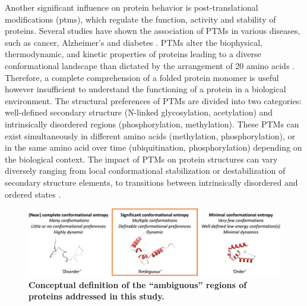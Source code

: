 Another significant influence on protein behavior is post-translational modifications (\gls{ptms}), which regulate the function, activity and stability of proteins. Several studies have shown the association of PTMs in various diseases, such as cancer, Alzheimer’s and diabetes \cite{mclaughlin_where_2016, song_post-translational_2019, bai_proteomic_2021}. PTMs alter the biophysical, thermodynamic, and kinetic properties of proteins leading to a diverse conformational landscape than dictated by the arrangement of 20 amino acids \cite{shental-bechor_effect_2008}. Therefore, a complete comprehension of a folded protein monomer is useful however insufficient to understand the functioning of a protein in a biological environment. The structural preferences of PTMs are divided into two categories: well-defined secondary structure (N-linked glycosylation, acetylation) and intrinsically disordered regions (phosphorylation, methylation). These PTMs can exist simultaneously in different amino acids (methylation, phosphorylation), or in the same amino acid over time (ubiquitination, phosphorylation) depending on the biological context. The impact of PTMs on protein structures can vary diversely ranging from local conformational stabilization or destabilization of secondary structure elements, to transitions between intrinsically disordered and ordered states \cite{bah_modulation_2016}. 

\begin{figure}[tbh]
    \centering
    \includegraphics[width=\linewidth]{ambiguous//figures_ambiguous/fig1.pdf}
    \caption{\textbf{Conceptual definition of the “ambiguous” regions of proteins addressed in this study.}}
    \label{fig:chapter5:fig1}
\end{figure}

